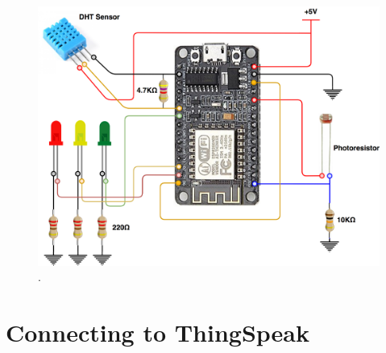 
\begin{figure}[H]
	\begin{center}
		\includegraphics[width=\textwidth]{./pictures/ESP-12E_wiring.png}
		\caption{.}
		\label{esp12_wiring}
	\end{center}
\end{figure}

\section{Connecting to ThingSpeak}

